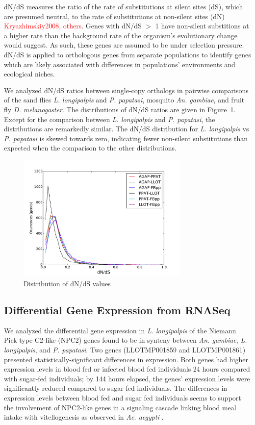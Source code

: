 dN/dS measures the ratio of the rate of substitutions at silent sites (dS), which are presumed neutral, to the rate of substitutions at non-silent sites (dN) \textcolor{red}{Kryazhimskiy2008, others}. Genes with dN/dS $>$ 1 have non-silent substitions at a higher rate than the background rate of the organism's evolutionary change would suggest.  As such, these genes are assumed to be under selection pressure.  dN/dS is applied to orthologous genes from separate populations to identify genes which are likely associated with differences in populations' environments and ecological niches.

We analyzed dN/dS ratios between single-copy orthologs in pairwise comparisons of the sand flies \emph{L. longipalpis} and \emph{P. papatasi}, mosquito \emph{An. gambiae}, and fruit fly \emph{D. melanogaster}.  The distributions of dN/dS ratios are given in Figure~\ref{fig:dnds-distr}.  Except for the comparison between \emph{L. longipalpis} and \emph{P. papatasi}, the distributions are remarkedly similar.  The dN/dS distribution for \emph{L. longipalpis} vs \emph{P. papatasi} is skewed towards zero, indicating fewer non-silent substitutions than expected when the comparison to the other distributions.

\begin{figure}[H]
  \centering
  \includegraphics[width=0.75\textwidth]{figures/ka_ks/dN_dS}
  \caption{Distribution of dN/dS values}
  \label{fig:dnds-distr}
\end{figure}

\subsection{Differential Gene Expression from RNASeq}
We analyzed the differential gene expression in \emph{L. longipalpis} of the Niemann Pick type C2-like (NPC2) genes found to be in synteny between \emph{An. gambiae}, \emph{L. longipalpis}, and \emph{P. papatasi}.  Two genes (LLOTMP001859 and LLOTMP001861) presented statistically-significant differences in expression. Both genes had higher expression levels in blood fed or infected blood fed individuals 24 hours compared with sugar-fed individuals; by 144 hours elapsed, the genes' expression levels were significantly reduced compared to sugar-fed individuals.  The differences in expression levels between blood fed and sugar fed individuals seems to support the involvement of NPC2-like genes in a signaling cascade linking blood meal intake with vitellogenesis as observed in \emph{Ae. aegypti} \cite{Sirot2011}.

